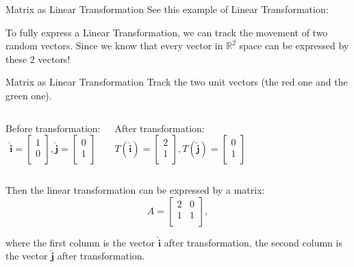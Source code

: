 \documentclass{beamer}
\begin{document}
\begin{frame}{Matrix as Linear Transformation}
See this example of Linear Transformation:


To fully express a Linear Transformation, we can track the movement of two random vectors. Since we know that every vector in $\mathbb{R}^2$ space can be expressed by these 2 vectors!
\end{frame}

\begin{frame}{Matrix as Linear Transformation}
\vspace{-3pt}
Track the two unit vectors (the red one and the green one).
\vspace{3pt}
\begin{columns}
\hspace{5pt}Before transformation:
\vspace{-3pt}
\begin{equation*}
    \boldsymbol{\hat{i}}=\left[ \begin{array}{c}
	1\\
	0\\
\end{array} \right] ,  \boldsymbol{\hat{j}}=\left[ \begin{array}{c}
	0\\
	1\\
\end{array} \right]
\end{equation*}

\hspace{5pt}After transformation:\
\vspace{-3pt}
\begin{equation*}
    T(\boldsymbol{\hat{i}})=\left[ \begin{array}{c}
	2\\
	1\\
\end{array} \right] ,  T(\boldsymbol{\hat{j}})=\left[ \begin{array}{c}
	0\\
	1\\
\end{array} \right]
\end{equation*}
\end{columns}
\vspace{3pt}
Then the linear transformation can be expressed by a matrix:
    \begin{equation*}
        A= \left[ \begin{matrix}
    	2&		0\\
    	1&		1\\
    \end{matrix} \right] ,
    \end{equation*}

where the first column is the vector $\boldsymbol{\hat{i}}$ after transformation, the second column is the vector $\boldsymbol{\hat{j}}$ after transformation.
\end{frame}
\end{document}
